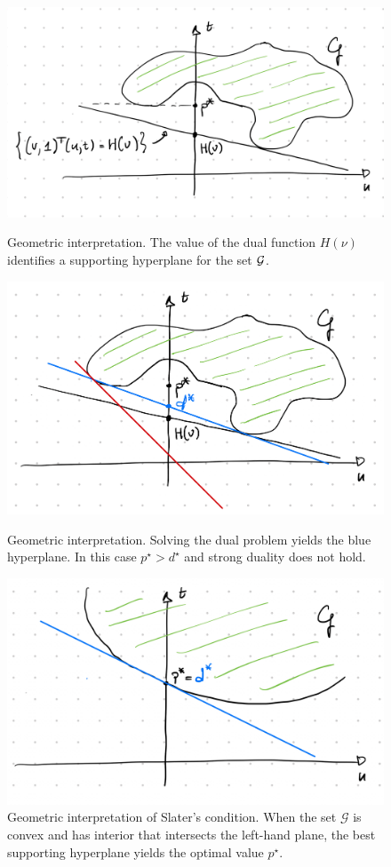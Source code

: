 \documentclass{report}
\begin{document}
\begin{figure}
	\centering
	\begin{minipage}{.48\textwidth}
		\centering
		\includegraphics[width=.8\textwidth]{images/geometric-primal-dual-1.png}	
		\caption{Geometric interpretation. The value of the dual function $H(\nu)$ identifies a supporting hyperplane for the set $\mathcal{G}$.}
		\label{fig:geom1}
	\end{minipage}
	\hfill
	\begin{minipage}{.48\textwidth}
		\centering
		\includegraphics[width=.8\textwidth]{images/geometric-primal-dual-2.png}	
		\caption{Geometric interpretation. Solving the dual problem yields the blue hyperplane. In this case $p^\star > d^\star$ and strong duality does not hold.}
		\label{fig:geom2}
	\end{minipage}
	\begin{minipage}{.48\textwidth}
		\centering
		\includegraphics[width=.8\textwidth]{images/geometric-primal-dual-3.png}	
		\caption{Geometric interpretation of Slater's condition. When the set $\mathcal G$ is convex and has interior that intersects the left-hand plane, the best supporting hyperplane yields the optimal value $p^\star$.}
		\label{fig:geom3}
	\end{minipage}
\end{figure}
\end{document}
